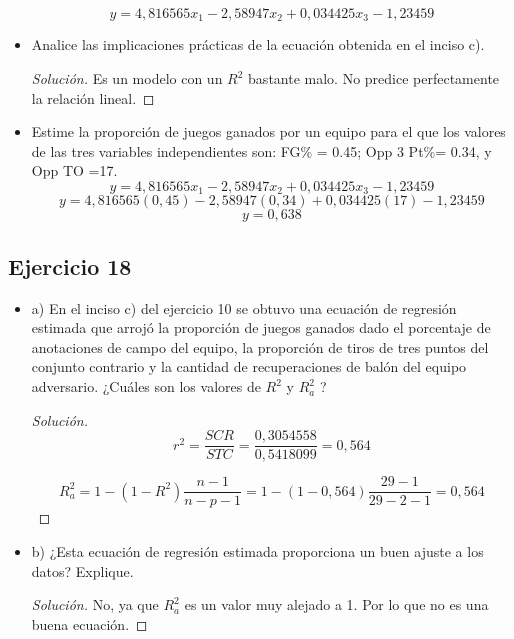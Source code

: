 \documentclass[a4paper,12pt]{article}
\newenvironment{solution}
  {\renewcommand\qedsymbol{$\blacksquare$}\begin{proof}[Solución]}
  {\end{proof}}
\begin{document}
\begin{itemize}
\begin{center}
    \end{center}
    $$y=4,816565x_1-2,58947x_2+0,034425x_3-1,23459$$
    
    \item Analice las implicaciones prácticas de la ecuación obtenida en el inciso c).
    \begin{solution}
    Es un modelo con un $R^2$ bastante malo. No predice perfectamente la relación lineal.
    \end{solution}
    \item Estime la proporción de juegos ganados por un equipo para el que los valores de las tres variables independientes son: FG\% = 0.45; Opp 3 Pt\%= 0.34, y Opp TO =17.
    $$y=4,816565x_1-2,58947x_2+0,034425x_3-1,23459$$
    $$y=4,816565(0,45)-2,58947(0,34)+0,034425(17)-1,23459$$
    $$y=0,638$$
\end{itemize}
\subsection{Ejercicio 18}
\begin{itemize}
    \item a) En el inciso c) del ejercicio 10 se obtuvo una ecuación de regresión estimada que arrojó la
proporción de juegos ganados dado el porcentaje de anotaciones de campo del equipo, la proporción de tiros de tres puntos del conjunto contrario y la cantidad de recuperaciones de balón del equipo adversario. ¿Cuáles son los valores de $R^2$ y $R^2_a$ ?
\begin{solution}
$$r^2=\frac{SCR}{STC}=\frac{0,3054558}{0,5418099}=0,564$$

$$
R_{a}^{2}=1-\left(1-R^{2}\right) \frac{n-1}{n-p-1}=1-(1-0,564) \frac{29-1}{29-2-1}=0,564
$$
\end{solution}  
\item b) ¿Esta ecuación de regresión estimada proporciona un buen ajuste a los datos? Explique.
\begin{solution}
No, ya que $R^2_a$ es un valor muy alejado a 1. Por lo que no es una buena ecuación.
\end{solution}
\end{itemize}
\end{document}
